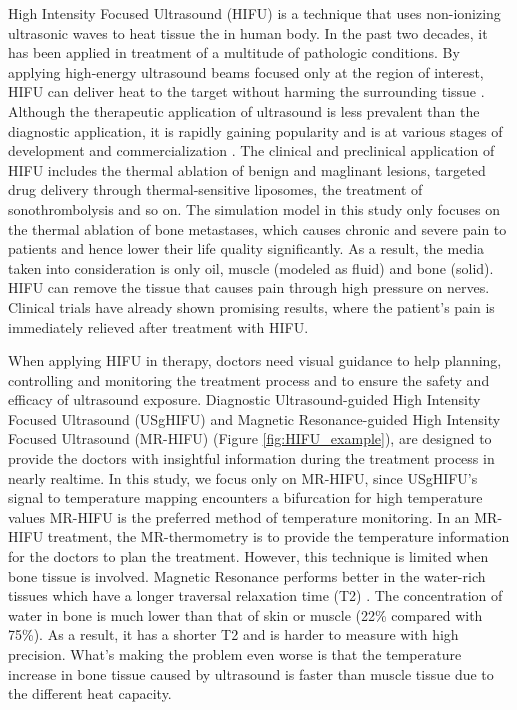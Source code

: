 
High Intensity Focused Ultrasound (HIFU) is a technique that uses non-ionizing ultrasonic waves to heat tissue the in human body. In the past two decades, it has been applied in treatment of a multitude of pathologic conditions. By applying high-energy ultrasound beams focused only at the region of interest, HIFU can deliver heat to the target without harming the surrounding tissue \cite{JENNE2012311}. Although the therapeutic application of ultrasound is less prevalent than the diagnostic application, it is rapidly gaining popularity and is at various stages of development and commercialization \cite{wp_HIFU}. The clinical and preclinical application of HIFU includes the thermal ablation of benign and maglinant lesions, targeted drug delivery through thermal-sensitive liposomes, the treatment of sonothrombolysis and so on. The simulation model in this study only focuses on the thermal ablation of bone metastases, which causes chronic and severe pain to patients and hence lower their life quality significantly. As a result, the media taken into consideration is only oil, muscle (modeled as fluid) and bone (solid). HIFU can remove the tissue that causes pain through high pressure on nerves. Clinical trials have already shown promising results, where the patient's pain is immediately relieved after treatment with HIFU\cite{vanwijk2013}.

When applying HIFU in therapy, doctors need visual guidance to help planning, controlling and monitoring the treatment process and to ensure the safety and efficacy of ultrasound exposure. Diagnostic Ultrasound-guided High Intensity Focused Ultrasound (USgHIFU) and Magnetic Resonance-guided High Intensity Focused Ultrasound (MR-HIFU) (Figure \ref{fig:HIFU_example}), are designed to provide the doctors with insightful information during the treatment process in nearly realtime. In this study, we focus only on MR-HIFU, since USgHIFU's signal to temperature mapping encounters a bifurcation for high temperature values MR-HIFU is the preferred method of temperature monitoring. In an MR-HIFU treatment, the MR-thermometry is to provide the temperature information for the doctors to plan the treatment. However, this technique is limited when bone tissue is involved. Magnetic Resonance performs better in the water-rich tissues which have a longer traversal relaxation time (T2) \cite{Modena_2018}. The concentration of water in bone is much lower than that of skin or muscle (22\% compared with 75\%). As a result, it has a shorter T2 and is harder to measure with high precision. What's making the problem even worse is that the temperature increase in bone tissue caused by ultrasound is faster than muscle tissue due to the different heat capacity.

